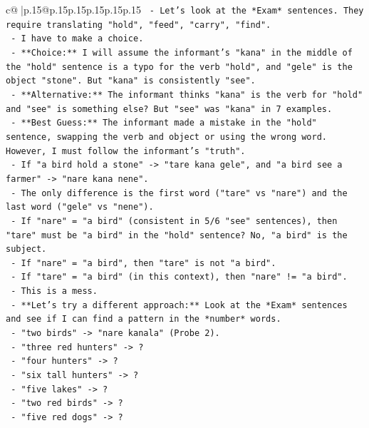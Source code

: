 \documentclass{article}
\begin{document}
{\begin{supertabular}{c@{$\;$}|p{.15\linewidth}@{}p{.15\linewidth}p{.15\linewidth}p{.15\linewidth}p{.15\linewidth}p{.15\linewidth}}
{{{\texttt{            {-} Let's look at the *Exam* sentences. They require translating "hold", "feed", "carry", "find".} \\
\texttt{            {-} I have to make a choice.} \\
\texttt{            {-} **Choice:** I will assume the informant's "kana" in the middle of the "hold" sentence is a typo for the verb "hold", and "gele" is the object "stone". But "kana" is consistently "see".} \\
\texttt{            {-} **Alternative:** The informant thinks "kana" is the verb for "hold" and "see" is something else? But "see" was "kana" in 7 examples.} \\
\texttt{            {-} **Best Guess:** The informant made a mistake in the "hold" sentence, swapping the verb and object or using the wrong word. However, I must follow the informant's "truth".} \\
\texttt{            {-} If "a bird hold a stone" {-}> "tare kana gele", and "a bird see a farmer" {-}> "nare kana nene".} \\
\texttt{            {-} The only difference is the first word ("tare" vs "nare") and the last word ("gele" vs "nene").} \\
\texttt{            {-} If "nare" = "a bird" (consistent in 5/6 "see" sentences), then "tare" must be "a bird" in the "hold" sentence? No, "a bird" is the subject.} \\
\texttt{            {-} If "nare" = "a bird", then "tare" is not "a bird".} \\
\texttt{            {-} If "tare" = "a bird" (in this context), then "nare" != "a bird".} \\
\texttt{            {-} This is a mess.} \\
\texttt{            {-} **Let's try a different approach:** Look at the *Exam* sentences and see if I can find a pattern in the *number* words.} \\
\texttt{            {-} "two birds" {-}> "nare kanala" (Probe 2).} \\
\texttt{            {-} "three red hunters" {-}> ?} \\
\texttt{            {-} "four hunters" {-}> ?} \\
\texttt{            {-} "six tall hunters" {-}> ?} \\
\texttt{            {-} "five lakes" {-}> ?} \\
\texttt{            {-} "two red birds" {-}> ?} \\
\texttt{            {-} "five red dogs" {-}> ?} \\
}}}
\end{supertabular}}
\end{document}
